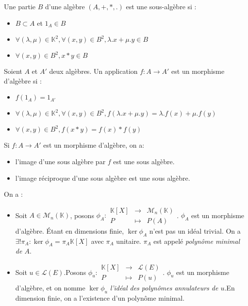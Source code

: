 \begin{defi} Une partie $B$ d'une algèbre $(A, +, *, .)$ est une sous-algèbre si :\begin{itemize}
    \item $B\subset A$ et $1_A\in B$
    \item $\forall (\lambda, \mu)\in\mathbb{K}^2,\forall(x,y)\in B^2, \lambda.x+\mu.y\in B$
    \item $\forall (x,y)\in B^2, x*y\in B$
\end{itemize}\end{defi}

\begin{defi} Soient $A$ et $A'$ deux algèbres. Un application $f:A\rightarrow A'$ est un morphisme d'algèbre si :\begin{itemize}
    \item $f(1_A) = 1_{A'}$
    \item $\forall(\lambda, \mu)\in\mathbb{K}^2,\forall(x,y)\in B^2, f(\lambda.x+\mu.y) = \lambda.f(x) + \mu.f(y)$
    \item $\forall(x,y)\in B^2, f(x*y) = f(x)*f(y)$
\end{itemize}\end{defi}

\begin{prop} Si $f:A\rightarrow A'$ est un morphisme d'algèbre, on a:\begin{itemize}
    \item l'image d'une sous algèbre par $f$ est une sous algèbre.
    \item l'image réciproque d'une sous algèbre est une sous algèbre.
\end{itemize}\end{prop}

\begin{defi} On a :\begin{itemize}
\item Soit $A\in\mathscr{M}_n(\mathbb{K})$, posons $\phi_A :\begin{array}{ccc} \mathbb{K}[X] & \rightarrow & \mathscr{M}_n(\mathbb{K}) \\ P & \mapsto & P(A)\end{array}$. $\phi_A$ est un morphisme d'algèbre. Étant en dimensions finie, $\ker\phi_A$ n'est pas un idéal trivial. On a $\exists!\pi_A:\ker\phi_A=\pi_A\mathbb{K}[X]$ avec $\pi_A$ unitaire. $\pi_A$ est appelé \emph{polynôme minimal de $A$}.
\item Soit $u\in\mathscr{L}(E)$.Posons $\phi_u :\begin{array}{ccc} \mathbb{K}[X] & \rightarrow & \mathscr{L}(E) \\ P & \mapsto & P(u)\end{array}$. $\phi_u$ est un morphisme d'algèbre, et on nomme $\ker\phi_u$ \emph{l'idéal des polynômes annulateurs de $u$}.En dimension finie, on a l'existence d'un polynôme minimal.
\end{itemize}\end{defi}

